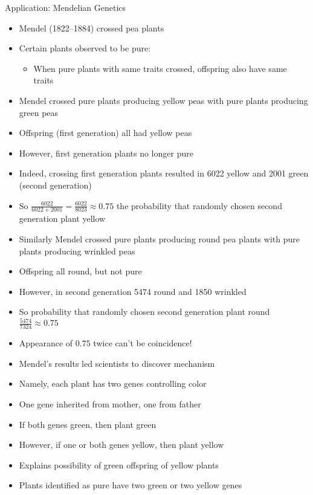 \documentclass{beamer}
\theoremstyle{definition}
\begin{document}
\begin{frame}{Application: Mendelian Genetics}
\begin{itemize}
\item Mendel (1822--1884) crossed pea plants 
\item Certain plants observed to be \alert{pure}:
\begin{itemize}
\item When pure plants with same traits crossed,
offspring also have same traits
\end{itemize}
\item Mendel crossed pure plants producing yellow peas
with pure plants producing green peas
\item Offspring (\alert{first generation}) all had yellow peas
\item However, first generation plants no longer pure
\item Indeed, crossing first generation plants resulted in 
6022 yellow and 2001 green (\alert{second generation})
\item So 
$\frac{6022}{6022+2001}=\frac{6022}{8023}\approx 0.75$
the probability that randomly chosen second generation plant yellow

\end{itemize}
\end{frame}

\begin{frame}
\begin{itemize}
\item Similarly Mendel crossed pure plants
producing round pea plants with pure plants producing wrinkled peas
\item Offspring all round, but not pure
\item However, in second generation 5474 round and 1850 wrinkled
\item So probability that randomly chosen second generation plant round
$\frac{5474}{7324}\approx 0.75$
\end{itemize}
\end{frame}

\begin{frame}
\begin{itemize}
\item Appearance of $0.75$ twice can't be coincidence!
\item Mendel's results led scientists to discover mechanism
\item Namely, each plant has two \alert{genes} controlling color
\item One gene inherited from mother, one from father
\item If both genes green, then plant green
\item However, if one or both genes yellow, then plant yellow
\item Explains possibility of green offspring of yellow plants
\item Plants identified as \alert{pure} have two green or two yellow genes
\end{itemize}
\end{frame}
\end{document}
